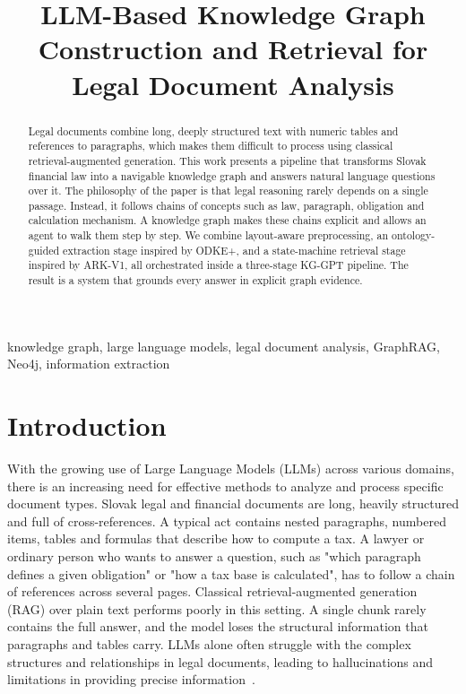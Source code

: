 \documentclass[conference]{IEEEtran}
\begin{document}
\title{LLM-Based Knowledge Graph Construction and Retrieval for Legal Document Analysis}

\author{
}

\maketitle

\begin{abstract}
Legal documents combine long, deeply structured text with numeric tables and references to paragraphs, which makes them difficult to process using classical retrieval-augmented generation. This work presents a pipeline that transforms Slovak financial law into a navigable knowledge graph and answers natural language questions over it. The philosophy of the paper is that legal reasoning rarely depends on a single passage. Instead, it follows chains of concepts such as law, paragraph, obligation and calculation mechanism. A knowledge graph makes these chains explicit and allows an agent to walk them step by step. We combine layout-aware preprocessing, an ontology-guided extraction stage inspired by ODKE+, and a state-machine retrieval stage inspired by ARK-V1, all orchestrated inside a three-stage KG-GPT pipeline. The result is a system that grounds every answer in explicit graph evidence.
\end{abstract}

\begin{IEEEkeywords}
knowledge graph, large language models, legal document analysis, GraphRAG, Neo4j, information extraction
\end{IEEEkeywords}

\section{Introduction}

With the growing use of Large Language Models (LLMs) across various domains, there is an increasing need for effective methods to analyze and process specific document types. Slovak legal and financial documents are long, heavily structured and full of cross-references. A typical act contains nested paragraphs, numbered items, tables and formulas that describe how to compute a tax. A lawyer or ordinary person who wants to answer a question, such as "which paragraph defines a given obligation" or "how a tax base is calculated", has to follow a chain of references across several pages. Classical retrieval-augmented generation (RAG) over plain text performs poorly in this setting. A single chunk rarely contains the full answer, and the model loses the structural information that paragraphs and tables carry. LLMs alone often struggle with the complex structures and relationships in legal documents, leading to hallucinations and limitations in providing precise information~\cite{b1}.
\end{document}
